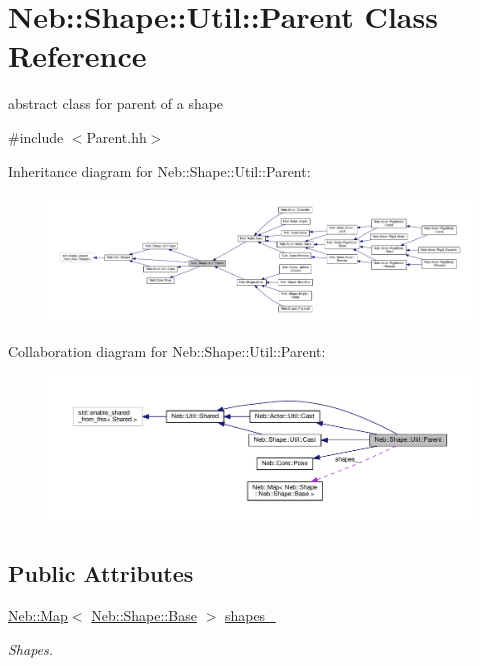 \hypertarget{classNeb_1_1Shape_1_1Util_1_1Parent}{\section{Neb\-:\-:Shape\-:\-:Util\-:\-:Parent Class Reference}
\label{classNeb_1_1Shape_1_1Util_1_1Parent}
}


abstract class for parent of a shape  




{\ttfamily \#include $<$Parent.\-hh$>$}



Inheritance diagram for Neb\-:\-:Shape\-:\-:Util\-:\-:Parent\-:
\nopagebreak
\begin{figure}[H]
\begin{center}
\leavevmode
\includegraphics[width=350pt]{classNeb_1_1Shape_1_1Util_1_1Parent__inherit__graph}
\end{center}
\end{figure}


Collaboration diagram for Neb\-:\-:Shape\-:\-:Util\-:\-:Parent\-:
\nopagebreak
\begin{figure}[H]
\begin{center}
\leavevmode
\includegraphics[width=350pt]{classNeb_1_1Shape_1_1Util_1_1Parent__coll__graph}
\end{center}
\end{figure}
\subsection*{Public Attributes}
\begin{DoxyCompactItemize}
\item 
\hypertarget{classNeb_1_1Shape_1_1Util_1_1Parent_a6ff0aa9934dfce1716c3c7ca1dd817a4}{\hyperlink{classNeb_1_1Map}{Neb\-::\-Map}$<$ \hyperlink{classNeb_1_1Shape_1_1Base}{Neb\-::\-Shape\-::\-Base} $>$ \hyperlink{classNeb_1_1Shape_1_1Util_1_1Parent_a6ff0aa9934dfce1716c3c7ca1dd817a4}{shapes\-\_\-}}\label{classNeb_1_1Shape_1_1Util_1_1Parent_a6ff0aa9934dfce1716c3c7ca1dd817a4}

\begin{DoxyCompactList}\small\item\em Shapes. \end{DoxyCompactList}\end{DoxyCompactItemize}
